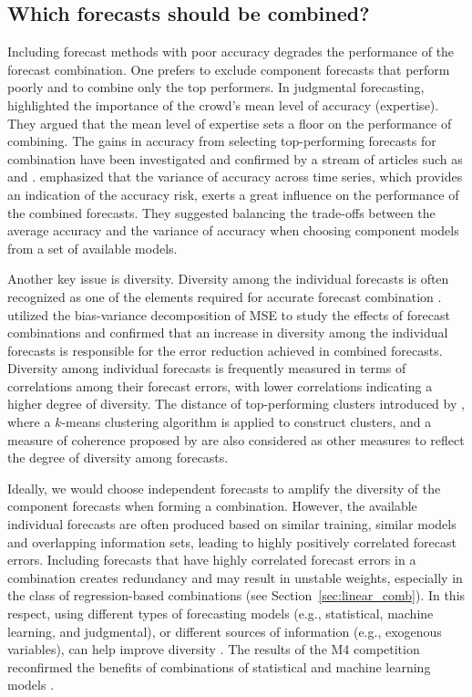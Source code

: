 \documentclass[11pt]{article}
\begin{document}
\subsection{Which forecasts should be combined?}
\label{sec:forecasts}

Including forecast methods with poor accuracy degrades the performance of the forecast combination. One prefers to exclude component forecasts that perform poorly and to combine only the top performers. In judgmental forecasting, \citet{Mannes2014-dl} highlighted the importance of the crowd's mean level of accuracy (expertise). They argued that the mean level of expertise sets a floor on the performance of combining. The gains in accuracy from selecting top-performing forecasts for combination have been investigated and confirmed by a stream of articles such as \citet{Budescu2015-tu} and \citet{Kourentzes2019-na}. \citet{Lichtendahl2020-ut} emphasized that the variance of accuracy across time series, which provides an indication of the accuracy risk, exerts a great influence on the performance of the combined forecasts. They suggested balancing the trade-offs between the average accuracy and the variance of accuracy when choosing component models from a set of available models.

Another key issue is diversity. Diversity among the individual forecasts is often recognized as one of the elements required for accurate forecast combination \citep{Batchelor1995-ps,Brown2005-aa,Thomson2019-al}. \citet{Atiya2020-ge} utilized the bias-variance decomposition of MSE to study the effects of forecast combinations and confirmed that an increase in diversity among the individual forecasts is responsible for the error reduction achieved in combined forecasts. Diversity among individual forecasts is frequently measured in terms of correlations among their forecast errors, with lower correlations indicating a higher degree of diversity. The distance of top-performing clusters introduced by \citet{Lemke2010-wn}, where a $k$-means clustering algorithm is applied to construct clusters, and a measure of coherence proposed by \citet{Thomson2019-al} are also considered as other measures to reflect the degree of diversity among forecasts.

Ideally, we would choose independent forecasts to amplify the diversity of the component forecasts when forming a combination. However, the available individual forecasts are often produced based on similar training, similar models and overlapping information sets, leading to highly positively correlated forecast errors. Including forecasts that have highly correlated forecast errors in a combination creates redundancy and may result in unstable weights, especially in the class of regression-based combinations (see Section~\ref{sec:linear_comb}). In this respect, using different types of forecasting models (e.g., statistical, machine learning, and judgmental), or different sources of information (e.g., exogenous variables), can help improve diversity \citep{Atiya2020-ge}. The results of the M4 competition reconfirmed the benefits of combinations of statistical and machine learning models \citep{Makridakis2020-hu}.
\end{document}
